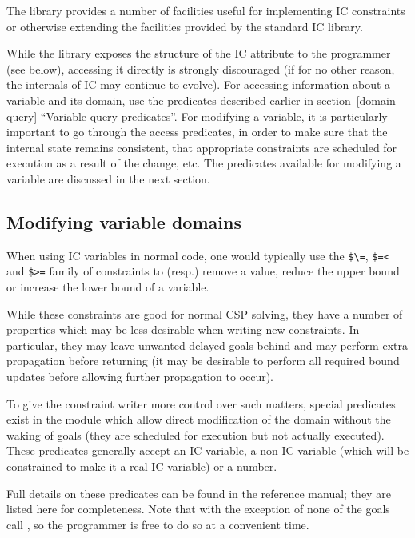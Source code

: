 The library  provides a
number of facilities useful for implementing IC constraints or otherwise
extending the facilities provided by the standard IC library.

While the  library
exposes the structure of the IC attribute to the programmer (see below),
accessing it directly is strongly discouraged (if for no other reason,
the internals of IC may continue to evolve).
For accessing information about a variable and its domain, use the
predicates described earlier in section~\ref{domain-query} ``Variable query
predicates''.
For modifying a variable, it is particularly important to go through the
access predicates, in order to make sure that the internal state remains
consistent, that appropriate constraints are scheduled for execution as a
result of the change, etc.
The predicates available for modifying a variable are discussed in the next
section.

\subsection{Modifying variable domains}

When using IC variables in normal code, one would typically use the
\verb|$\=|, \verb|$=<| and \verb|$>=| family of constraints to (resp.)
remove a value, reduce the upper bound or increase the lower bound of a
variable.

While these constraints are good for normal CSP solving, they have a
number of properties which may be less desirable when writing new
constraints.  In particular, they may leave unwanted delayed goals
behind and may perform extra propagation before returning (it may be
desirable to perform all required bound updates before allowing further
propagation to occur).

To give the constraint writer more control over such matters, special
predicates exist in the 
module which allow direct modification of the domain without the waking of
goals (they are scheduled for execution but not actually executed).
These predicates generally accept an IC variable, a non-IC variable (which
will be constrained to make it a real IC variable) or a number.

Full details on these predicates can be found in the reference manual; they
are listed here for completeness.  Note that with the exception of
 none of
the goals call , so
the programmer is free to do so at a convenient time.

